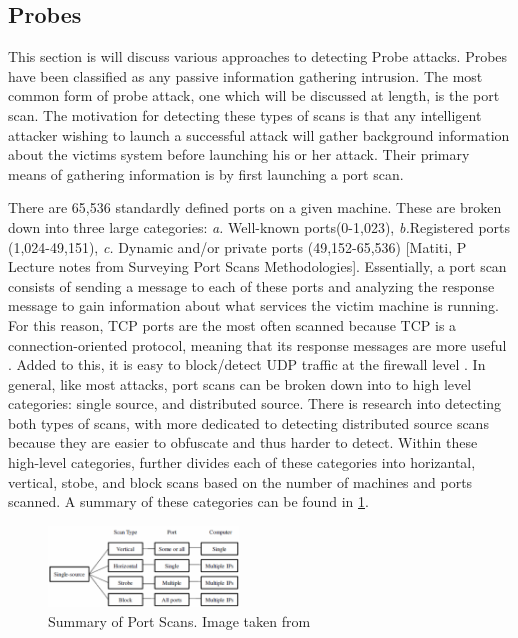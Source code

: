 \documentclass{acm_proc_article-sp}
\begin{document}
    \subsection{Probes}
	 This section is will discuss various approaches to detecting Probe attacks. Probes have been classified as any passive information gathering intrusion. The most common form of probe attack, one which will be discussed at length, is the port scan. The motivation for detecting these types of scans is that any intelligent attacker wishing to launch a successful attack will gather background information about the victims system before launching his or her attack. Their primary means of gathering information is by first launching a port scan.
	 
	 There are 65,536 standardly defined ports on a given machine. These are broken down into three large categories: \emph{a.} Well-known ports(0-1,023), \emph{b.}Registered ports (1,024-49,151), \emph{c.} Dynamic and/or private ports (49,152-65,536) [Matiti, P Lecture notes from Surveying Port Scans Methodologies]. %
Essentially, a port scan consists of sending a message to each of these ports and analyzing the response message to gain information about what services the victim machine is running. For this reason, TCP ports are the most often scanned because TCP is a connection-oriented protocol, meaning that its response messages are more useful \cite{SilenokElena;RoedelChris;Silenok}. Added to this, it is easy to block/detect UDP traffic at the firewall level \cite{Bhuyan2011}. In general, like most attacks, port scans can be broken down into to high level categories: single source, and distributed source. There is research into detecting both types of scans, with more dedicated to detecting distributed source scans because they are easier to obfuscate and thus harder to detect. Within these high-level categories, \cite{Staniford2002} further divides each of these categories into horizantal, vertical, stobe, and block scans based on the number of machines and ports scanned. A summary of these categories can be found in \ref{portScans}.
	\begin{figure}[h!]
		\centering
		\includegraphics[width=0.45\textwidth]{portScans.png}
		\caption{Summary of Port Scans. Image taken from \cite{Bhuyan2011}}
		\label{portScans}
	\end{figure}
	
\end{document}
